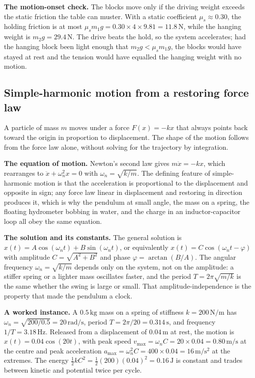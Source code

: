 \textbf{The motion-onset check.} The blocks move only if the driving
weight exceeds the static friction the table can muster. With a static
coefficient $\mu_{s}\approx 0.30$, the holding friction is at most
$\mu_{s}m_{1}g=0.30\times 4\times 9.81=11.8\,\si{\newton}$, while the
hanging weight is $m_{2}g=29.4\,\si{\newton}$. The drive beats the
hold, so the system accelerates; had the hanging block been light
enough that $m_{2}g<\mu_{s}m_{1}g$, the blocks would have stayed at rest
and the tension would have equalled the hanging weight with no motion.

\subsection{Simple-harmonic motion from a restoring force law}

A particle of mass $m$ moves under a force $F(x)=-kx$ that always points
back toward the origin in proportion to displacement. The shape of the
motion follows from the force law alone, without solving for the
trajectory by integration.

\textbf{The equation of motion.} Newton's second law gives $m\ddot{x}=
-kx$, which rearranges to $\ddot{x}+\omega_{n}^{2}x=0$ with
$\omega_{n}=\sqrt{k/m}$. The defining feature of simple-harmonic motion
is that the acceleration is proportional to the displacement and
opposite in sign; any force law linear in displacement and restoring in
direction produces it, which is why the pendulum at small angle, the
mass on a spring, the floating hydrometer bobbing in water, and the
charge in an inductor-capacitor loop all obey the same equation.

\textbf{The solution and its constants.} The general solution is
$x(t)=A\cos(\omega_{n}t)+B\sin(\omega_{n}t)$, or equivalently
$x(t)=C\cos(\omega_{n}t-\varphi)$ with amplitude $C=\sqrt{A^{2}+B^{2}}$
and phase $\varphi=\arctan(B/A)$. The angular frequency $\omega_{n}=
\sqrt{k/m}$ depends only on the system, not on the amplitude: a
stiffer spring or a lighter mass oscillates faster, and the period
$T=2\pi\sqrt{m/k}$ is the same whether the swing is large or small.
That amplitude-independence is the property that made the pendulum a
clock.

\textbf{A worked instance.} A $0.5\,\si{\kilogram}$ mass on a spring of
stiffness $k=200\,\si{\newton\per\meter}$ has $\omega_{n}=\sqrt{200/
0.5}=20\,\si{\radian\per\second}$, period $T=2\pi/20=0.314\,\si{
\second}$, and frequency $1/T=3.18\,\si{\hertz}$. Released from a
displacement of $0.04\,\si{\meter}$ at rest, the motion is $x(t)=0.04
\cos(20t)$, with peak speed $v_{\max}=\omega_{n}C=20\times 0.04=
0.80\,\si{\meter\per\second}$ at the centre and peak acceleration
$a_{\max}=\omega_{n}^{2}C=400\times 0.04=16\,\si{\meter\per\second
\squared}$ at the extremes. The energy
$\tfrac{1}{2}kC^{2}=\tfrac{1}{2}(200)(0.04)^{2}=0.16\,\si{\joule}$ is
constant and trades between kinetic and potential twice per cycle.

